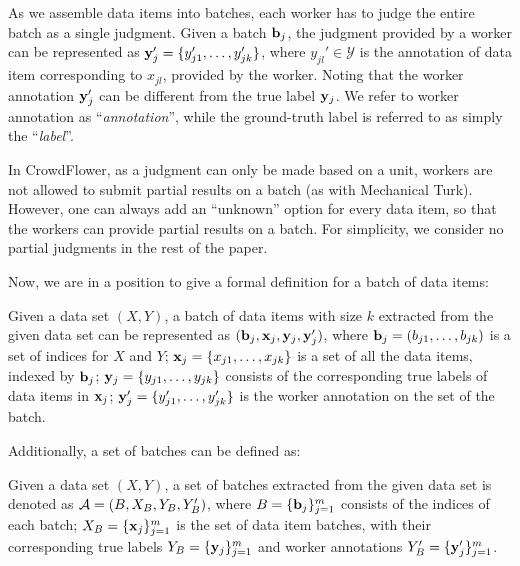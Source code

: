 
%

As we assemble data items into batches, 
each worker has to judge the entire batch as a single judgment.  
Given a batch ${\mathbf{b}}_j$, the judgment provided by a worker can be represented as ${\mathbf{y}}_j' = \{y_{j1}', \ldots, y_{jk}'\}$, 
where $y_{jl}' \in \mathcal{Y}$ is the annotation of data item corresponding to 
$x_{jl}$, provided by the worker.
Noting that the worker annotation ${\mathbf{y}}_j'$ can be different from the true label ${\mathbf{y}}_j$.  
We refer to worker annotation as ``\emph{annotation}'', 
while the ground-truth label is referred to as simply the ``\emph{label}''.  

In CrowdFlower, as a judgment can only be made based on a unit,
workers are not allowed to submit partial results on a batch 
(as with Mechanical Turk).
However, one can always add an ``unknown'' option for every data item,
so that the workers can provide partial results on a batch.  
For simplicity, we consider no partial judgments in the rest of the paper.  

Now, we are in a position to give a formal definition for a batch of data items:
\begin{definition}
[Batch]
Given a data set $(X, Y)$,
a batch of data items with size $k$ extracted from the given data set can be represented as $({\mathbf{b}}_j, {\mathbf{x}}_j, {\mathbf{y}}_j, {\mathbf{y}}_j')$, 
where ${\mathbf{b}}_j = (b_{j1}, \ldots, b_{jk})$ is a set of indices for $X$ and $Y$; 
${\mathbf{x}}_j = \{x_{j1}, \ldots, x_{jk}\}$ is a set of all the data items, indexed by ${\mathbf{b}}_j$; %
${\mathbf{y}}_j = \{y_{j1}, \ldots, y_{jk}\}$ consists of the corresponding true labels of data items in ${\mathbf{x}}_j$; %
${\mathbf{y}}_j' = \{y_{j1}', \ldots, y_{jk}'\}$ is the worker annotation on the set of the batch.  
\end{definition}

\noindent Additionally, a set of batches can be defined as:

\begin{definition}
Given a data set $(X, Y)$, 
a set of batches extracted from the given data set is denoted as ${\mathcal{A}} = (B, X_B, Y_B, Y_B')$, 
where $B=\{{\mathbf{b}}_j\}_{j=1}^m$ consists of the indices of each batch; 
$X_B=\{{\mathbf{x}}_j\}_{j=1}^m$ is the set of data item batches, 
with their corresponding true labels $Y_B=\{{\mathbf{y}}_j\}_{j=1}^m$ 
and worker annotations $Y_B'=\{{\mathbf{y}}_j'\}_{j=1}^m$.  
\end{definition}

